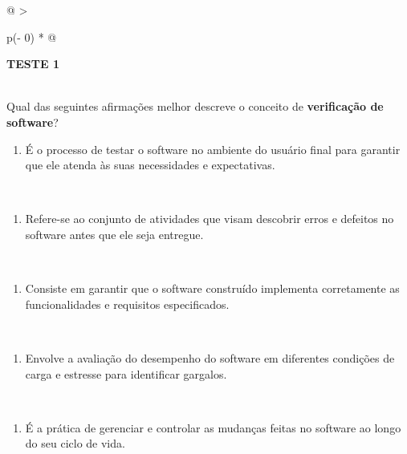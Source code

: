 \documentclass[
]{book}
\providecommand{\tightlist}{%
  \setlength{\itemsep}{0pt}\setlength{\parskip}{0pt}}
\begin{document}
\begin{longtable}[]{@{}
  >{\raggedright\arraybackslash}p{(\columnwidth - 0\tabcolsep) * }@{}}
\toprule\noalign{}
\begin{minipage}[b]{\linewidth}\raggedright
\textbf{TESTE 1}
\end{minipage} \\
\midrule\noalign{}
\endhead
\bottomrule\noalign{}
\endlastfoot
Qual das seguintes afirmações melhor descreve o conceito de \textbf{verificação de software}? \\
\begin{minipage}[t]{\linewidth}\raggedright
\begin{enumerate}
\def\labelenumi{\Alph{enumi})}
\tightlist
\item
  É o processo de testar o software no ambiente do usuário final para garantir que ele atenda às suas necessidades e expectativas.
\end{enumerate}
\end{minipage} \\
\begin{minipage}[t]{\linewidth}\raggedright
\begin{enumerate}
\def\labelenumi{\Alph{enumi})}
\setcounter{enumi}{1}
\tightlist
\item
  Refere-se ao conjunto de atividades que visam descobrir erros e defeitos no software antes que ele seja entregue.
\end{enumerate}
\end{minipage} \\
\begin{minipage}[t]{\linewidth}\raggedright
\begin{enumerate}
\def\labelenumi{\Alph{enumi})}
\setcounter{enumi}{2}
\tightlist
\item
  Consiste em garantir que o software construído implementa corretamente as funcionalidades e requisitos especificados.
\end{enumerate}
\end{minipage} \\
\begin{minipage}[t]{\linewidth}\raggedright
\begin{enumerate}
\def\labelenumi{\Alph{enumi})}
\setcounter{enumi}{3}
\tightlist
\item
  Envolve a avaliação do desempenho do software em diferentes condições de carga e estresse para identificar gargalos.
\end{enumerate}
\end{minipage} \\
\begin{minipage}[t]{\linewidth}\raggedright
\begin{enumerate}
\def\labelenumi{\Alph{enumi})}
\setcounter{enumi}{4}
\tightlist
\item
  É a prática de gerenciar e controlar as mudanças feitas no software ao longo do seu ciclo de vida.
\end{enumerate}
\end{minipage} \\
\end{longtable}
\end{document}
